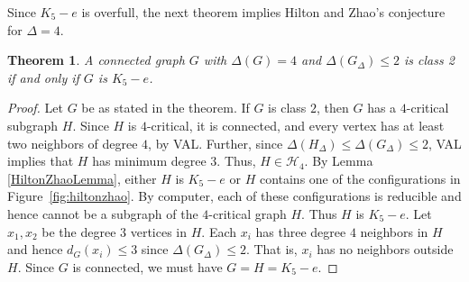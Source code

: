 \documentclass[12pt]{article}
\theoremstyle{plain}
\newtheorem{thm}{Theorem}[section]
\theoremstyle{definition}
\theoremstyle{remark}
\newcommand{\fancy}[1]{\mathcal{#1}}
\newcommand{\size}[1]{\left\Vert#1\right\Vert}
\def\H{\fancy{H}}
\begin{document}
Since $K_5 - e$ is overfull, the next theorem implies Hilton and Zhao's conjecture
for $\Delta=4$.  

\begin{thm}
A connected graph $G$ with $\Delta(G) = 4$ and $\Delta(G_\Delta) \le 2$ is
class 2 if and only if $G$ is $K_5-e$.
\end{thm}
%
%
%

\begin{proof} %
Let $G$ be as stated in the theorem.
If $G$ is class $2$, then $G$ has a $4$-critical subgraph $H$.   Since
$H$ is $4$-critical, it is connected, 
and every vertex has at least two neighbors of degree $4$, by VAL.  
Further, since $\Delta(H_\Delta) \le \Delta(G_\Delta) \le 2$, VAL implies
that $H$ has minimum degree $3$. 
Thus, $H \in \H_4$.  By Lemma \ref{HiltonZhaoLemma}, 
either $H$ is $K_5-e$ or $H$ contains one of
the configurations in Figure~\ref{fig:hiltonzhao}.  By computer, each of these
configurations is reducible and hence cannot be a subgraph of the $4$-critical
graph $H$.  Thus $H$ is $K_5-e$.  Let $x_1,x_2$ be the degree $3$ vertices in
$H$.  Each $x_i$ has three degree $4$ neighbors in $H$ and hence $d_G(x_i) \le
3$ since $\Delta(G_\Delta) \le 2$.  That is, $x_i$ has no neighbors outside
$H$.  Since $G$ is connected, we must have $G = H = K_5 - e$. 
\end{proof}
\end{document}
